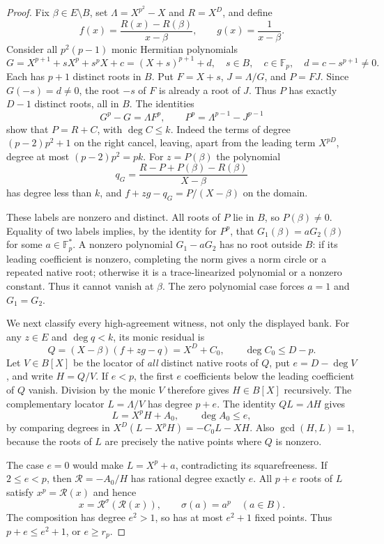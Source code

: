 \begin{proof}
Fix $\beta\in E\setminus B$, set $\Lambda=X^{p^2}-X$ and $R=X^D$,
and define
\[
 f(x)=\frac{R(x)-R(\beta)}{x-\beta},\qquad
 g(x)=\frac1{x-\beta}.
\]
Consider all $p^2(p-1)$ monic Hermitian polynomials
\[
 G=X^{p+1}+sX^p+s^pX+c=(X+s)^{p+1}+d,
 \quad s\in B,\quad c\in\mathbb F_p,\quad
 d=c-s^{p+1}\ne0.
\]
Each has $p+1$ distinct roots in $B$. Put $F=X+s$, $J=\Lambda/G$,
and $P=FJ$. Since $G(-s)=d\ne0$, the root $-s$ of $F$ is already
a root of $J$. Thus $P$ has exactly $D-1$ distinct roots, all in $B$.
The identities
\[
 G^p-G=\Lambda F^p,\qquad
 P^p=\Lambda^{p-1}-J^{p-1}
\]
show that $P=R+C$, with $\deg C\le k$. Indeed the terms of degree
$(p-2)p^2+1$ on the right cancel, leaving, apart from the leading
term $X^{pD}$, degree at most $(p-2)p^2=pk$.
For $z=P(\beta)$ the polynomial
\[
 q_G=\frac{R-P+P(\beta)-R(\beta)}{X-\beta}
\]
has degree less than $k$, and $f+zg-q_G=P/(X-\beta)$ on the domain.

These labels are nonzero and distinct. All roots of $P$ lie in $B$,
so $P(\beta)\ne0$. Equality of two labels implies, by the identity
for $P^p$, that $G_1(\beta)=aG_2(\beta)$ for some
$a\in\mathbb F_p^*$. A nonzero polynomial $G_1-aG_2$ has no root
outside $B$: if its leading coefficient is nonzero, completing the
norm gives a norm circle or a repeated native root; otherwise it is
a trace-linearized polynomial or a nonzero constant. Thus it cannot
vanish at $\beta$. The zero polynomial case forces $a=1$ and
$G_1=G_2$.

We next classify every high-agreement witness, not only the displayed
bank. For any $z\in E$ and $\deg q<k$, its monic residual is
\[
 Q=(X-\beta)(f+zg-q)=X^D+C_0,\qquad \deg C_0\le D-p.
\]
Let $V\in B[X]$ be the locator of \emph{all} distinct native roots
of $Q$, put $e=D-\deg V$, and write $H=Q/V$. If $e<p$, the first
$e$ coefficients below the leading coefficient of $Q$ vanish.
Division by the monic $V$ therefore gives $H\in B[X]$ recursively.
The complementary locator $L=\Lambda/V$ has degree $p+e$.
The identity $QL=\Lambda H$ gives
\[
 L=X^pH+A_0,\qquad \deg A_0\le e,
\]
by comparing degrees in $X^D(L-X^pH)=-C_0L-XH$.
Also $\gcd(H,L)=1$, because the roots of $L$ are precisely the
native points where $Q$ is nonzero.

The case $e=0$ would make $L=X^p+a$, contradicting its
squarefreeness. If $2\le e<p$, then $\mathcal R=-A_0/H$ has rational
degree exactly $e$. All $p+e$ roots of $L$ satisfy
$x^p=\mathcal R(x)$ and hence
\[
 x=\mathcal R^\sigma(\mathcal R(x)),\qquad \sigma(a)=a^p
 \quad(a\in B).
\]
The composition has degree $e^2>1$, so has at most $e^2+1$ fixed
points. Thus $p+e\le e^2+1$, or $e\ge r_p$.


\end{proof}
